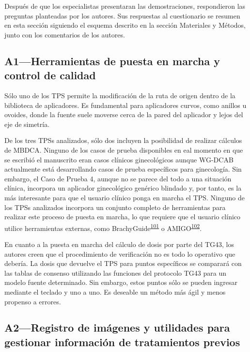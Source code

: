 \documentclass[
  a4paper,
]{scrreprt}
\begin{document}
Después de que los especialistas presentaran las demostraciones,
respondieron las preguntas planteadas por los autores. Sus respuestas al
cuestionario se resumen en esta sección siguiendo el esquema descrito en
la sección Materiales y Métodos, junto con los comentarios de los
autores.

\hypertarget{sec-a1}{%
\subsection{A1---Herramientas de puesta en marcha y control de
calidad}\label{sec-a1}}

Sólo uno de los TPS permite la modificación de la ruta de origen dentro
de la biblioteca de aplicadores. Es fundamental para aplicadores curvos,
como anillos u ovoides, donde la fuente suele moverse cerca de la pared
del aplicador y lejos del eje de simetría.

De los tres TPSs analizados, sólo dos incluyen la posibilidad de
realizar cálculos de MBDCA. Ninguno de los casos de prueba disponibles
en eal momento en que se escribió el manuscrito eran casos clínicos
ginecológicos aunque WG-DCAB actualmente está desarrollando casos de
prueba específicos para ginecología. Sin embargo, el Caso de Prueba 4,
aunque no se parece del todo a una situación clínica, incorpora un
aplicador ginecológico genérico blindado y, por tanto, es la más
interesante para que el usuario clínico ponga en marcha el TPS. Ninguno
de los TPSs analizados incorpora un conjunto completo de herramientas
para realizar este proceso de puesta en marcha, lo que requiere que el
usuario clínico utilice herramientas externas, como
BrachyGuide\textsuperscript{\protect\hyperlink{ref-pantelis2015}{101}} o
AMIGO\textsuperscript{\protect\hyperlink{ref-fonseca2014}{102}}.

En cuanto a la puesta en marcha del cálculo de dosis por parte del TG43,
los autores creen que el procedimiento de verificación no es todo lo
operativo que debería. La dosis que devuelve el TPS para puntos
específicos se comparará con las tablas de consenso utilizando las
funciones del protocolo TG43 para un modelo fuente determinado. Sin
embargo, estos puntos sólo se pueden ingresar mediante el teclado y uno
a uno. Es deseable un método más ágil y menos propenso a errores.

\hypertarget{sec-a2}{%
\subsection{A2---Registro de imágenes y utilidades para gestionar
información de tratamientos previos}\label{sec-a2}}
\end{document}
